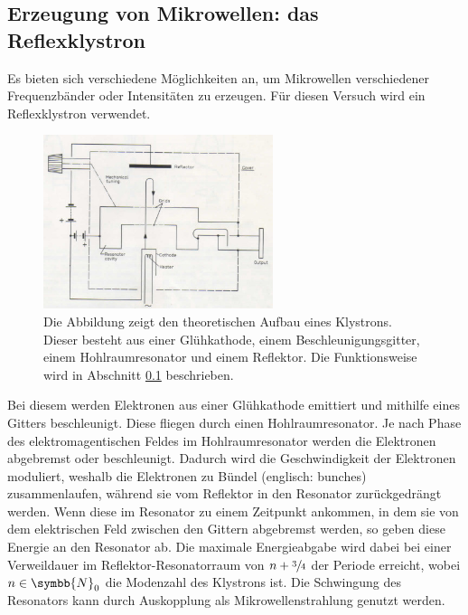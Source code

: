         \subsection{Erzeugung von Mikrowellen: das Reflexklystron}\label{ssec:1.3}
            Es bieten sich verschiedene Möglichkeiten an, um Mikrowellen verschiedener Frequenzbänder oder Intensitäten zu erzeugen.
            Für diesen Versuch wird ein Reflexklystron verwendet.
            \begin{figure}[H]
                \centering
                \includegraphics[width=0.6\textwidth]{pics/klystron.jpg}
                \caption{
                    Die Abbildung zeigt den theoretischen Aufbau eines Klystrons.
                    Dieser besteht aus einer Glühkathode, einem Beschleunigungsgitter,
                    einem Hohlraumresonator und einem Reflektor. Die Funktionsweise wird in Abschnitt \ref{ssec:1.3} beschrieben. \cite{Mikro}
                }
                \label{fig:1}
            \end{figure}
            Bei diesem werden Elektronen aus einer Glühkathode emittiert und mithilfe eines Gitters beschleunigt.
            Diese fliegen durch einen Hohlraumresonator.
            Je nach Phase des elektromagentischen Feldes im Hohlraumresonator werden die Elektronen abgebremst oder beschleunigt.
            Dadurch wird die Geschwindigkeit der Elektronen moduliert, weshalb die Elektronen zu Bündel (englisch: bunches) zusammenlaufen, während sie vom Reflektor in den Resonator zurückgedrängt werden.
            Wenn diese im Resonator zu einem Zeitpunkt ankommen, in dem sie von dem elektrischen Feld zwischen den Gittern abgebremst werden, so geben diese Energie an den Resonator ab.
            Die maximale Energieabgabe wird dabei bei einer Verweildauer im Reflektor-Resonatorraum von $n+\sfrac{3}{4}$ der Periode erreicht, wobei $n\in\symbb{N}_0$ die Modenzahl des Klystrons ist.
            Die Schwingung des Resonators kann durch Auskopplung als Mikrowellenstrahlung genutzt werden.
